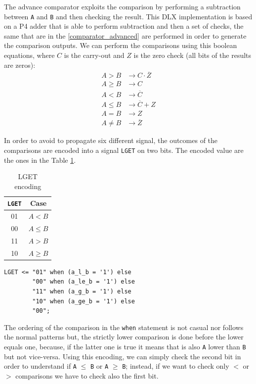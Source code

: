 The advance comparator exploits the comparison by performing a subtraction between \texttt{A} and \texttt{B} and then checking the result. This DLX implementation is based on a P4 adder that is able to perform subtraction and then a set of checks, the same that are in the \ref{comparator_advanced} are performed in order to generate the comparison outputs. We can perform the comparisons using this boolean equations, where $C$ is the carry-out and $Z$ is the zero check (all bits of the results are zeros):
\begin{align*}
	A > B &\rightarrow C \cdot \overline{Z}\\
	A \geq B &\rightarrow C\\
	A < B  &\rightarrow \overline{C}\\
	A \leq B &\rightarrow \overline{C} + Z\\
	A = B &\rightarrow Z\\
	A \neq B  &\rightarrow \overline{Z} 
\end{align*}

 In order to avoid to propagate six different signal, the outcomes of the comparisons are encoded into a signal \texttt{LGET} on two bits. The encoded value are the ones in the Table \ref{tab:lget}.
 \begin{multicols}{2}
 	\begin{table}[H]
 		\begin{center}
 			\begin{tabular}{ c| c}
 				\texttt{LGET} & Case\\
 				\hline
 				01 & $A < B$ \\
 				00 & $A \leq B$ \\
 				11 & $A > B$ \\
 				10 & $A \geq B$
 				
 			\end{tabular}
 			\caption{LGET encoding}
 			\label{tab:lget}
 		\end{center}
 	\end{table}
 	
 	\columnbreak
 	
 	\begin{lstlisting}[style=vhdl,caption={VHDL code for the encodig},label=lget_code]
 	LGET <= "01" when (a_l_b = '1') else
	 	"00" when (a_le_b = '1') else 
	 	"11" when (a_g_b = '1') else
	 	"10" when (a_ge_b = '1') else
	 	"00";
 	\end{lstlisting}
 \end{multicols}

The ordering of the comparison in the \texttt{when} statement is not casual nor follows the normal patterns but, the strictly lower comparison is done before the lower equals one, because, if the latter one is true it means that is also \texttt{A} lower than \texttt{B} but not vice-versa. Using this encoding, we can simply check the second bit in order to understand if \texttt{A} $\leq$ \texttt{B} or \texttt{A} $\geq$ \texttt{B}; instead, if we want to check only $<$ or $>$ comparisons we have to check also the first bit.

